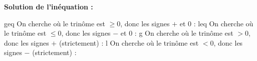{\begin{MultiColonnes}{2}
\begin{tcbenumerate}[2][4]

    \tcbitem[raster multicolumn=2]\textbf{Solution de l'inéquation :}

    \def\tempgeq{geq}\def\templeq{leq}\def\tempg{g}\def\templ{l}%
    \ifx\typeineg\tempgeq
        On cherche où le trinôme est $\geq 0$, donc les signes $+$ et $0$ :
    \fi
    \ifx\typeineg\templeq
        On cherche où le trinôme est $\leq 0$, donc les signes $-$ et $0$ :
    \fi
    \ifx\typeineg\tempg
        On cherche où le trinôme est $> 0$, donc les signes $+$ (strictement) :
    \fi
    \ifx\typeineg\templ
        On cherche où le trinôme est $< 0$, donc les signes $-$ (strictement) :
    \fi


\end{tcbenumerate}
\end{MultiColonnes}}
